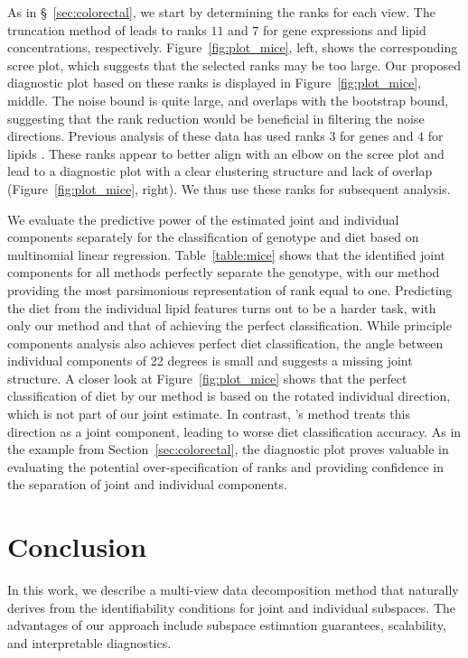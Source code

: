 \documentclass{amsart}
\begin{document}
As in \S~\ref{sec:colorectal}, we start by determining the ranks for each view.  The truncation method of \citet{gavish2014optimal} leads to ranks $11$ and $7$ for gene expressions and lipid concentrations, respectively. Figure~\ref{fig:plot_mice}, left, shows the corresponding scree plot, which suggests that the selected ranks may be too large. Our proposed diagnostic plot based on these ranks is displayed in Figure~\ref{fig:plot_mice}, middle. The noise bound is quite large, and overlaps with the bootstrap bound, suggesting that the rank reduction would be beneficial in filtering the noise directions. Previous analysis of these data has used ranks $3$ for genes and $4$ for lipids \citep{yuan2022exponential}. These ranks appear to better align with an elbow on the scree plot and lead to a diagnostic plot with a clear clustering structure and lack of overlap (Figure~\ref{fig:plot_mice}, right). We thus use these ranks for subsequent analysis.


We evaluate the predictive power of the estimated joint and individual components separately for the classification of genotype and diet based on multinomial linear regression. Table~\ref{table:mice} shows that the identified joint components for all methods perfectly separate the genotype, with our method providing the most parsimonious representation of rank equal to one. Predicting the diet from the individual lipid features turns out to be a harder task, with only our method and that of \citet{park2020integrative} achieving the perfect classification. While principle components analysis also achieves perfect diet classification, the angle between individual components of 22 degrees is small and suggests a missing joint structure. A closer look at Figure~\ref{fig:plot_mice} shows that the perfect classification of diet by our method is based on the rotated individual direction, which is not part of our joint estimate. In contrast, \citet{feng2018angle}'s method treats this direction as a joint component, leading to worse diet classification accuracy. As in the example from Section~\ref{sec:colorectal}, the diagnostic plot proves valuable in evaluating the potential over-specification of ranks and providing confidence in the separation of joint and individual components.

\section{Conclusion}

In this work, we describe a multi-view data decomposition method that naturally derives from the identifiability conditions for joint and individual subspaces. The advantages of our approach include subspace estimation guarantees, scalability, and interpretable diagnostics. %
\end{document}
